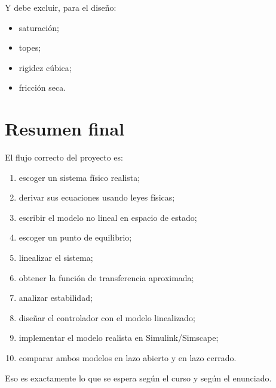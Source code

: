 \documentclass[11pt]{article}
\begin{document}
Y debe excluir, para el dise\~no:

\begin{itemize}[leftmargin=1.2cm]
\item saturaci\'on;
\item topes;
\item rigidez c\'ubica;
\item fricci\'on seca.
\end{itemize}

\section{Resumen final}

El flujo correcto del proyecto es:

\begin{enumerate}[leftmargin=1.2cm]
\item escoger un sistema f\'isico realista;
\item derivar sus ecuaciones usando leyes f\'isicas;
\item escribir el modelo no lineal en espacio de estado;
\item escoger un punto de equilibrio;
\item linealizar el sistema;
\item obtener la funci\'on de transferencia aproximada;
\item analizar estabilidad;
\item dise\~nar el controlador con el modelo linealizado;
\item implementar el modelo realista en Simulink/Simscape;
\item comparar ambos modelos en lazo abierto y en lazo cerrado.
\end{enumerate}

Eso es exactamente lo que se espera seg\'un el curso y seg\'un el enunciado.
\end{document}
